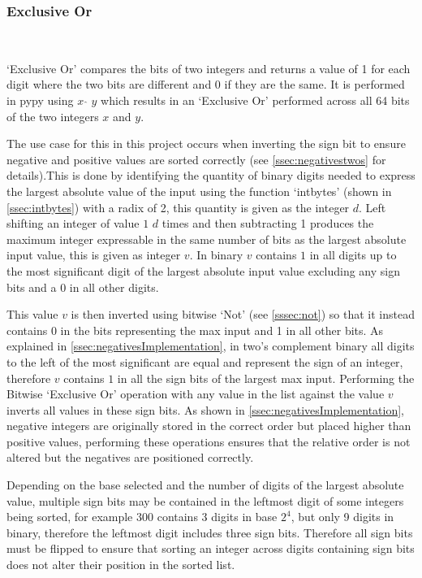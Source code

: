 \documentclass[12pt]{article}
\begin{document}
\subsubsection{Exclusive Or}\
\label{sssec:xor}
\par
`Exclusive Or' compares the bits of two integers and returns a value of 1 for each digit where the two bits are different and 0 if they are the same. It is performed in pypy using $x$ $\hat{}$ $y$ which results in an `Exclusive Or' performed across all 64 bits of the two integers $x$ and $y$. 
\par
The use case for this in this project occurs when inverting the sign bit to ensure negative and positive values are sorted correctly (see \ref{ssec:negativestwos} for details).This is done by identifying the quantity of binary digits needed to express the largest absolute value of the input using the function `int\textunderscore bytes' (shown in \ref{ssec:intbytes}) with a radix of 2, this quantity is given as the integer $d$. Left shifting an integer of value $1$ $d$ times and then subtracting 1 produces the maximum integer expressable in the same number of bits as the largest absolute input value, this is given as integer $v$. In binary $v$ contains $1$ in all digits up to the most significant digit of the largest absolute input value excluding any sign bits and a 0 in all other digits.
\par
This value $v$ is then inverted using bitwise `Not' (see \ref{sssec:not}) so that it instead contains $0$ in the bits representing the max input and 1 in all other bits. As explained in \ref{ssec:negativesImplementation}, in two's complement binary all digits to the left of the most significant are equal and represent the sign of an integer, therefore $v$ contains $1$ in all the sign bits of the largest max input. Performing the Bitwise `Exclusive Or' operation with any value in the list against the value $v$ inverts all values in these sign bits. As shown in \ref{ssec:negativesImplementation}, negative integers are originally stored in the correct order but placed higher than positive values, performing these operations ensures that the relative order is not altered but the negatives are positioned correctly.
\par
Depending on the base selected and the number of digits of the largest absolute value, multiple sign bits may be contained in the leftmost digit of some integers being sorted, for example $300$ contains 3 digits in base $2^4$, but only 9 digits in binary, therefore the leftmost digit includes three sign bits. Therefore all sign bits must be flipped to ensure that sorting an integer across digits containing sign bits does not alter their position in the sorted list.
\end{document}
